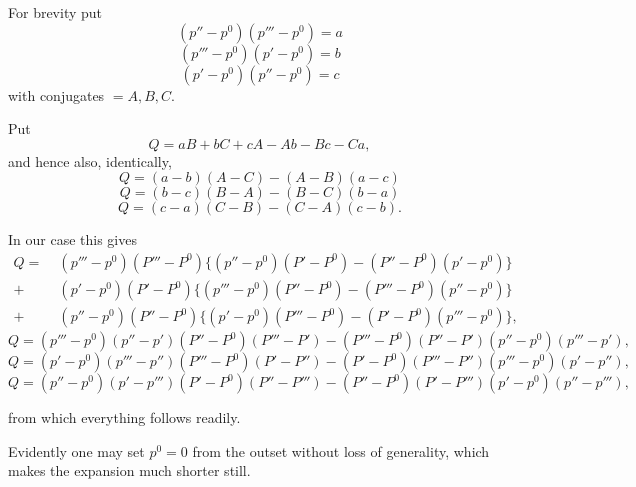 
For brevity put
\[
(p''-p^0)(p'''-p^0) = a
\]
\[
(p'''-p^0)(p'-p^0) = b
\]
\[
(p'-p^0)(p''-p^0) = c
\]
with conjugates $= A, B, C$.

Put
\begin{equation}
Q = aB+bC+cA-Ab-Bc-Ca,
\tag*{1)}
\end{equation}
and hence also, identically,
\begin{equation}
Q = (a-b)(A-C)-(A-B)(a-c)
\tag*{2)}
\end{equation}
\begin{equation}
Q = (b-c)(B-A)-(B-C)(b-a)
\tag*{3)}
\end{equation}
\begin{equation}
Q = (c-a)(C-B)-(C-A)(c-b).
\tag*{4)}
\end{equation}

In our case this gives
\begin{equation}
\begin{aligned}
Q = \;& (p'''-p^0)(P'''-P^0)\{(p''-p^0)(P'-P^0)-(P''-P^0)(p'-p^0)\}\\
+\;& (p'-p^0)(P'-P^0)\{(p'''-p^0)(P''-P^0)-(P'''-P^0)(p''-p^0)\}\\
+\;& (p''-p^0)(P''-P^0)\{(p'-p^0)(P'''-P^0)-(P'-P^0)(p'''-p^0)\},
\end{aligned}
\tag{1}
\end{equation}
\begin{equation}
Q=(p'''-p^0)(p''-p')(P''-P^0)(P'''-P') - (P'''-P^0)(P''-P')(p''-p^0)(p'''-p'),
\tag{2}
\end{equation}
\begin{equation}
Q=(p'-p^0)(p'''-p'')(P'''-P^0)(P'-P'') - (P'-P^0)(P'''-P'')(p'''-p^0)(p'-p''),
\tag{3}
\end{equation}
\begin{equation}
Q=(p''-p^0)(p'-p''')(P'-P^0)(P''-P''') - (P''-P^0)(P'-P''')(p'-p^0)(p''-p'''),
\tag{4}
\end{equation}

from which everything follows readily.

Evidently one may set $p^0=0$ from the outset without loss of generality, which makes the expansion much shorter still.

